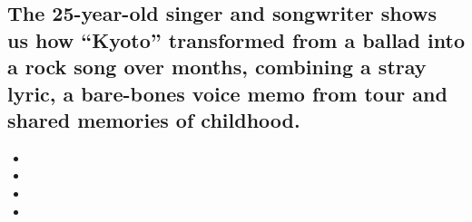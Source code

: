 \hypertarget{the-25-year-old-singer-and-songwriter-shows-us-how-kyoto-transformed-from-a-ballad-into-a-rock-song-over-months-combining-a-stray-lyric-a-bare-bones-voice-memo-from-tour-and-shared-memories-of-childhood-1}{%
\subsection{The 25-year-old singer and songwriter shows us how ``Kyoto''
transformed from a ballad into a rock song over months, combining a
stray lyric, a bare-bones voice memo from tour and shared memories of
childhood.}\label{the-25-year-old-singer-and-songwriter-shows-us-how-kyoto-transformed-from-a-ballad-into-a-rock-song-over-months-combining-a-stray-lyric-a-bare-bones-voice-memo-from-tour-and-shared-memories-of-childhood-1}}

\begin{itemize}
\item
\item
\item
\item
\end{itemize}

